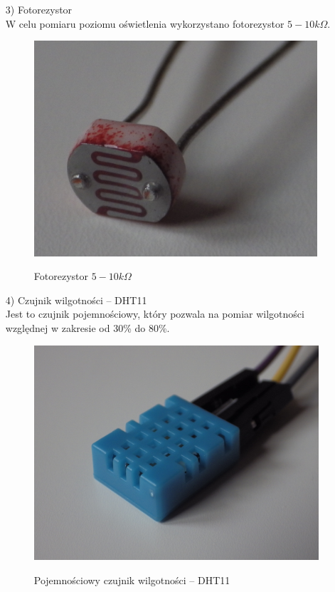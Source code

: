 \documentclass[12pt,a4paper]{article}
\begin{document}
\begin{enumerate}
\newpage	
	
	\item[3)]Fotorezystor\\
	W celu pomiaru poziomu oświetlenia wykorzystano fotorezystor $5-10k\Omega$.

\begin{figure}[!h]	
\centering
	\includegraphics[height =80mm]{fotorezystor.jpg}
	\label{fotorezystor}
	\caption{Fotorezystor $5-10k\Omega$}
\end{figure}	
	
	\item[4)]Czujnik wilgotności -- DHT11\\
	Jest to czujnik pojemnościowy, który pozwala na pomiar wilgotności względnej w zakresie od 30\% do 80\%.

\begin{figure}[!h]	
\centering
	\includegraphics[height =80mm]{DHT11.jpg}
	\label{DHT11}
	\caption{Pojemnościowy czujnik wilgotności -- DHT11}
\end{figure}		
	
\end{enumerate}
\end{document}
